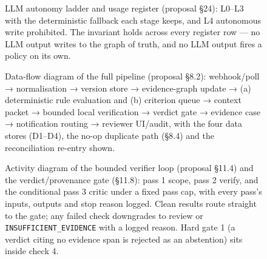 \begin{landscape}
\begin{figure}[p]
  \centering
  \resizebox{\linewidth}{!}{}
  \caption{LLM autonomy ladder and usage register (proposal §24): L0–L3 with
           the deterministic fallback each stage keeps, and L4 autonomous
           write prohibited. The invariant holds across every register row —
           no LLM output writes to the graph of truth, and no LLM output
           fires a policy on its own.}
  \label{fig:autonomy-ladder}
\end{figure}
\end{landscape}

\begin{landscape}
\begin{figure}[p]
  \centering
  \resizebox{\linewidth}{!}{}
  \caption{Data-flow diagram of the full pipeline (proposal §8.2):
           webhook/poll → normalisation → version store → evidence-graph
           update → (a) deterministic rule evaluation and (b) criterion
           queue → context packet → bounded local verification → verdict
           gate → evidence case → notification routing → reviewer UI/audit,
           with the four data stores (D1–D4), the no-op duplicate path
           (§8.4) and the reconciliation re-entry shown.}
  \label{fig:dfd}
\end{figure}
\end{landscape}

\begin{landscape}
\begin{figure}[p]
  \centering
  \resizebox{\linewidth}{!}{}
  \caption{Activity diagram of the bounded verifier loop (proposal §11.4)
           and the verdict/provenance gate (§11.8): pass 1 scope, pass 2
           verify, and the conditional pass 3 critic under a fixed pass cap,
           with every pass's inputs, outputs and stop reason logged. Clean
           results route straight to the gate; any failed check downgrades
           to review or \texttt{INSUFFICIENT\_EVIDENCE} with a logged reason.
           Hard gate 1 (a verdict citing no evidence span is rejected as an
           abstention) sits inside check 4.}
  \label{fig:verifier-loop}
\end{figure}
\end{landscape}
